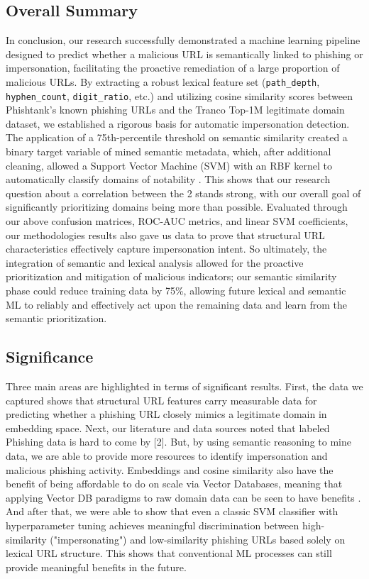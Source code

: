 \documentclass[conference]{IEEEtran}
\begin{document}
\subsection{Overall Summary}
In conclusion, our research successfully demonstrated a machine learning pipeline designed to predict whether a malicious URL is semantically linked to phishing or impersonation, facilitating the proactive remediation of a large proportion of malicious URLs. By extracting a robust lexical feature set (\texttt{path\_depth}, \texttt{hyphen\_count}, \texttt{digit\_ratio}, etc.) and utilizing cosine similarity scores between Phishtank’s known phishing URLs and the Tranco Top-1M legitimate domain dataset, we established a rigorous basis for automatic impersonation detection. The application of a 75th-percentile threshold on semantic similarity created a binary target variable of mined semantic metadata, which, after additional cleaning, allowed a Support Vector Machine (SVM) with an RBF kernel to automatically classify domains of notability \cite{datacamp}. This shows that our research question about a correlation between the 2 stands strong, with our overall goal of significantly prioritizing domains being more than possible. Evaluated through our above confusion matrices, ROC-AUC metrics, and linear SVM coefficients, our methodologies results also gave us data to prove that structural URL characteristics effectively capture impersonation intent. So ultimately, the integration of semantic and lexical analysis allowed for the proactive prioritization and mitigation of malicious indicators; our semantic similarity phase could reduce training data by 75\%, allowing future lexical and semantic ML to reliably and effectively act upon the remaining data and learn from the semantic prioritization.
\subsection{Significance}
Three main areas are highlighted in terms of significant results. First, the data we captured shows that structural URL features carry measurable data for predicting whether a phishing URL closely mimics a legitimate domain in embedding space.
Next, our literature and data sources noted that labeled Phishing data is hard to come by [2]. But, by using semantic reasoning to mine data, we are able to provide more resources to identify impersonation and malicious phishing activity. Embeddings and cosine similarity also have the benefit of being affordable to do on scale via Vector Databases, meaning that applying Vector DB paradigms to raw domain data can be seen to have benefits \cite{su_2024}.
And after that, we were able to show that even a classic SVM classifier with hyperparameter tuning achieves meaningful discrimination between high-similarity ("impersonating") and low-similarity phishing URLs based solely on lexical URL structure. This shows that conventional ML processes can still provide meaningful benefits in the future.
\end{document}
